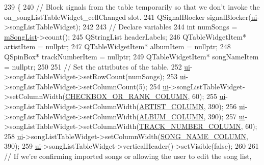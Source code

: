 \begin{DoxyCode}
239 \{
240     \textcolor{comment}{// Block signals from the table temporarily so that we don't invoke the
       on\_songListTableWidget\_cellChanged slot.}
241     QSignalBlocker signalBlocker(\mbox{\hyperlink{class_song_list_viewer_window_ac24fa09133b92a7b4cbd757f9b84258d}{ui}}->songListTableWidget);
242 
243     \textcolor{comment}{// Declare variables}
244     \textcolor{keywordtype}{int} numSongs = \mbox{\hyperlink{class_song_list_viewer_window_a02558cb095f356a1288e5663bc2e1955}{mSongList}}->count();
245     QStringList headerLabels;
246     QTableWidgetItem* artistItem = \textcolor{keyword}{nullptr};
247     QTableWidgetItem* albumItem = \textcolor{keyword}{nullptr};
248     QSpinBox* trackNumberItem = \textcolor{keyword}{nullptr};
249     QTableWidgetItem* songNameItem = \textcolor{keyword}{nullptr};
250 
251     \textcolor{comment}{// Set the attributes of the table.}
252     \mbox{\hyperlink{class_song_list_viewer_window_ac24fa09133b92a7b4cbd757f9b84258d}{ui}}->songListTableWidget->setRowCount(numSongs);
253     \mbox{\hyperlink{class_song_list_viewer_window_ac24fa09133b92a7b4cbd757f9b84258d}{ui}}->songListTableWidget->setColumnCount(5);
254     \mbox{\hyperlink{class_song_list_viewer_window_ac24fa09133b92a7b4cbd757f9b84258d}{ui}}->songListTableWidget->setColumnWidth(\mbox{\hyperlink{songlistviewerwindow_8h_a43772c536452cd8ed0af845b585487bf}{CHECKBOX\_OR\_RANK\_COLUMN}}, 60);
255     \mbox{\hyperlink{class_song_list_viewer_window_ac24fa09133b92a7b4cbd757f9b84258d}{ui}}->songListTableWidget->setColumnWidth(\mbox{\hyperlink{songlistviewerwindow_8h_a4df933f03e6d62e433d019b597e25109}{ARTIST\_COLUMN}}, 390);
256     \mbox{\hyperlink{class_song_list_viewer_window_ac24fa09133b92a7b4cbd757f9b84258d}{ui}}->songListTableWidget->setColumnWidth(\mbox{\hyperlink{songlistviewerwindow_8h_a36e2a49e6de166851f1039129ea2a9fb}{ALBUM\_COLUMN}}, 390);
257     \mbox{\hyperlink{class_song_list_viewer_window_ac24fa09133b92a7b4cbd757f9b84258d}{ui}}->songListTableWidget->setColumnWidth(\mbox{\hyperlink{songlistviewerwindow_8h_ab082e8ecd5faa2301f1d67d8df3b0eee}{TRACK\_NUMBER\_COLUMN}}, 60);
258     \mbox{\hyperlink{class_song_list_viewer_window_ac24fa09133b92a7b4cbd757f9b84258d}{ui}}->songListTableWidget->setColumnWidth(\mbox{\hyperlink{songlistviewerwindow_8h_a7376276fcf9a1862cfadc5ab562d3672}{SONG\_NAME\_COLUMN}}, 390);
259     \mbox{\hyperlink{class_song_list_viewer_window_ac24fa09133b92a7b4cbd757f9b84258d}{ui}}->songListTableWidget->verticalHeader()->setVisible(\textcolor{keyword}{false});
260 
261     \textcolor{comment}{// If we're confirming imported songs or allowing the user to edit the song list,}

\end{DoxyCode}
